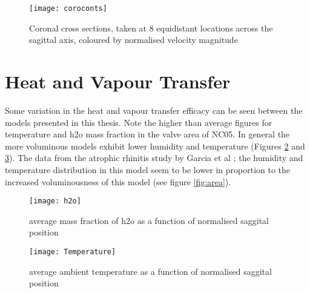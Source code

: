 \begin{figure} 
  \texttt{[image: coroconts]}
  \caption{Coronal cross sections, taken at 8 equidistant locations across the sagittal axis, coloured by normalised velocity magnitude}
  \label{fig:vcc}
\end{figure}

\section{Heat and Vapour Transfer}

Some variation in the heat and vapour transfer efficacy can be seen between the models presented in this thesis. Note the higher than average figures for temperature and h2o mass fraction in the valve area of NC05. In general the more voluminous models exhibit lower humidity and temperature (Figures \ref{fig:h2o} and \ref{fig:Temp}). The data from the atrophic rhinitis study by Garcia et al \cite{Garcia2007}; the humidity and temperature distribution in this model seem to be lower in proportion to the increased voluminousness of this model (see figure \ref{fig:area}).

\begin{figure} 
  \texttt{[image: h2o]}
  \caption{average mass fraction of h2o as a function of normalised saggital position}
  \label{fig:h2o}
\end{figure}


\begin{figure} 
  \texttt{[image: Temperature]}
  \caption{average ambient temperature as a function of normalised saggital position}
  \label{fig:Temp}
\end{figure}
